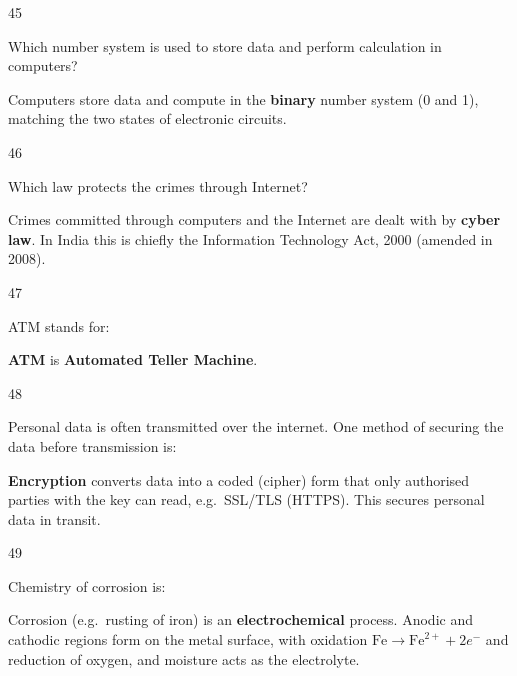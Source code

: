 \begin{question}{45}
{Which number system is used to store data and perform calculation in computers?\par}
\begin{explain}
Computers store data and compute in the \textbf{binary} number system (0 and 1), matching the two states of electronic circuits.
\end{explain}
\end{question}

\begin{question}{46}
{Which law protects the crimes through Internet?\par}
\begin{explain}
Crimes committed through computers and the Internet are dealt with by \textbf{cyber law}. In India this is chiefly the Information Technology Act, 2000 (amended in 2008).
\end{explain}
\end{question}

\begin{question}{47}
{ATM stands for:\par}
\begin{explain}
\textbf{ATM} is \textbf{Automated Teller Machine}.
\end{explain}
\end{question}

\begin{question}{48}
{Personal data is often transmitted over the internet. One method of securing the data before transmission is:\par}
\begin{explain}
\textbf{Encryption} converts data into a coded (cipher) form that only authorised parties with the key can read, e.g.\ SSL/TLS (HTTPS). This secures personal data in transit.
\end{explain}
\end{question}

\begin{question}{49}
{Chemistry of corrosion is:\par}
\begin{explain}
Corrosion (e.g.\ rusting of iron) is an \textbf{electrochemical} process. Anodic and cathodic regions form on the metal surface, with oxidation $\mathrm{Fe}\rightarrow\mathrm{Fe}^{2+}+2e^-$ and reduction of oxygen, and moisture acts as the electrolyte.
\end{explain}
\end{question}

